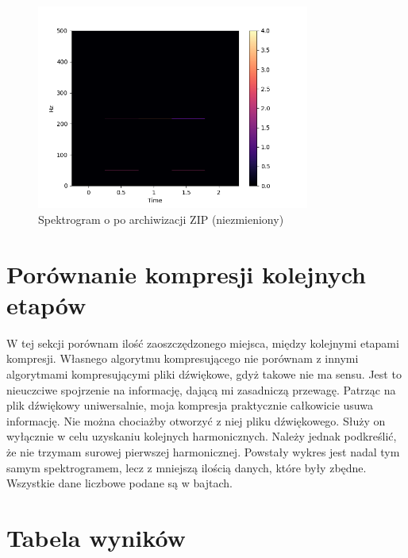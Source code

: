 \documentclass[a4paper,12pt]{extarticle}
\begin{document}
\begin{figure}[h!]
\centering
\includegraphics[width=0.8\textwidth]{spec-zip}
\caption{Spektrogram o po archiwizacji ZIP (niezmieniony)}
\end{figure}

\clearpage

\section*{Porównanie kompresji kolejnych etapów}

W tej sekcji porównam ilość zaoszczędzonego miejsca, między kolejnymi etapami kompresji. Własnego algorytmu kompresującego nie porównam z innymi algorytmami kompresującymi pliki dźwiękowe, gdyż takowe nie ma sensu. Jest to nieuczciwe spojrzenie na informację, dającą mi zasadniczą przewagę. Patrząc na plik dźwiękowy uniwersalnie, moja kompresja praktycznie całkowicie usuwa informację. Nie można chociażby otworzyć z niej pliku dźwiękowego. Służy on wyłącznie w celu uzyskaniu kolejnych harmonicznych. Należy jednak podkreślić, że nie trzymam surowej pierwszej harmonicznej. Powstały wykres jest nadal tym samym spektrogramem, lecz z mniejszą ilością danych, które były zbędne. Wszystkie dane liczbowe podane są w bajtach.

\clearpage


\section*{Tabela wyników}
\end{document}
